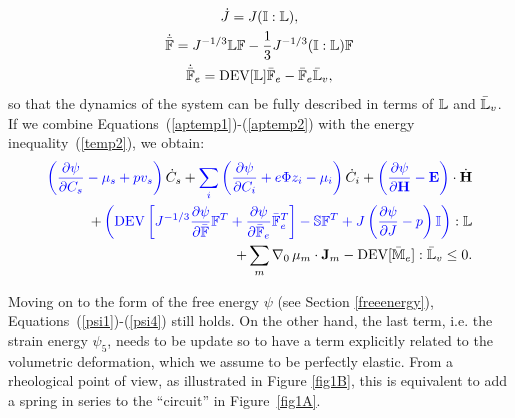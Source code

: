 \begin{gather}
\dot{J} = J (\mathbb{I}:\mathbb{L}),\\
\dot{\bar{\mathbb{F}}} = J^{-1/3} \mathbb{L} \mathbb{F} - \frac{1}{3} J^{-1/3} (\mathbb{I}:\mathbb{L}) \mathbb{F} \\
\dot{\bar{\mathbb{F}}}_e = \text{DEV}[\mathbb{L}] \bar{\mathbb{F}}_e -\bar{\mathbb{F}}_e \bar{\mathbb{L}}_v,\label{aptemp2}
\end{gather}
so that the dynamics of the system can be fully described in terms of $\mathbb{L}$ and $\bar{\mathbb{L}}_v$. If we combine Equations~(\ref{aptemp1})-(\ref{aptemp2}) with the energy inequality~(\ref{temp2}), we obtain:
\begin{equation}
\begin{aligned}
\color{blue} \left(\frac{\partial \psi}{\partial C_s}-\mu_s+p v_s\right)\color{black}\dot{C}_s+ \color{blue}\sum_i\left(\frac{\partial \psi}{\partial C_i} + e\Phi z_i-\mu_i\right)\color{black} \dot{C}_i
+\color{blue}\left(\frac{\partial \psi}{\partial \mathbf{H}}-\mathbf{E}\right) \color{black} \cdot \dot{\mathbf{H}}\\
+\color{blue} \left(\text{DEV}\left[J^{-1/3}\frac{\partial \psi}{\partial \bar{\mathbb{F}}}\mathbb{F}^T + \frac{\partial \psi}{\partial \bar{\mathbb{F}}_e}\bar{\mathbb{F}}_e^{T}\right]- \mathbb{S}\mathbb{F}^T +J\left(\frac{\partial \psi}{\partial J} - p\right)\mathbb{I}\right)\color{black}:\mathbb{L}\\
+ \sum_m \nabla_0 \,\mu_m \cdot \mathbf{J}_m - \text{DEV}[\mathbb{\bar{M}}_e]:\mathbb{\bar{L}}_v\leq 0 . \label{ineq2}
\end{aligned}
\end{equation}

Moving on to the form of the free energy $\psi$ (see Section \ref{freeenergy}), Equations~(\ref{psi1})-(\ref{psi4}) still holds. On the other hand, the last term, i.e. the strain energy $\psi_5$, needs to be update so to have a term explicitly related to the volumetric deformation, which we assume to be perfectly elastic. From a rheological point of view, as illustrated in Figure \ref{fig1B}, this is equivalent to add a spring in series to the \textquotedblleft circuit'' in Figure~\ref{fig1A}.

